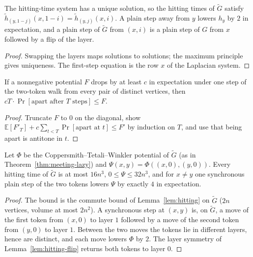 \begin{lemma}\label{lem:hitting-flip}
\leanok{}
The hitting-time system has a unique solution, so the hitting times of $\tilde G$ satisfy
$\tilde h_{(y,1-j)}(x,1-i)=\tilde h_{(y,j)}(x,i)$. A plain step away from $y$ lowers $h_y$ by $2$
in expectation, and a plain step of $\tilde G$ from $(x,i)$ is a plain step of $G$ from $x$
followed by a flip of the layer.
\end{lemma}
\begin{proof}\leanok
Swapping the layers maps solutions to solutions; the maximum principle gives uniqueness. The
first-step equation is the row $x$ of the Laplacian system.
\end{proof}
\begin{lemma}\label{lem:additive-drift}
\leanok{}
If a nonnegative potential $F$ drops by at least $c$ in expectation under one step of the
two-token walk from every pair of distinct vertices, then
$cT\cdot\Pr[\text{apart after }T\text{ steps}]\le F$.
\end{lemma}
\begin{proof}\leanok
Truncate $F$ to $0$ on the diagonal, show
$\mathbb E[F'_T]+c\sum_{t<T}\Pr[\text{apart at }t]\le F'$ by induction on $T$, and use that
being apart is antitone in $t$.
\end{proof}
\begin{lemma}\label{lem:plain-drift}
\leanok{}
Let $\Phi$ be the Coppersmith--Tetali--Winkler potential of $\tilde G$ (as in
Theorem~\ref{thm:meeting-lazy}) and $\Psi(x,y)=\Phi((x,0),(y,0))$. Every hitting time of
$\tilde G$ is at most $16n^3$, $0\le\Psi\le 32n^3$, and for $x\neq y$ one synchronous plain step
of the two tokens lowers $\Psi$ by exactly $4$ in expectation.
\end{lemma}
\begin{proof}\leanok
The bound is the commute bound of Lemma~\ref{lem:hitting} on $\tilde G$ ($2n$ vertices, volume
at most $2n^2$). A synchronous step at $(x,y)$ is, on $\tilde G$, a move of the first token from
$(x,0)$ to layer $1$ followed by a move of the second token from $(y,0)$ to layer $1$. Between
the two moves the tokens lie in different layers, hence are distinct, and each move lowers
$\Phi$ by $2$. The layer symmetry of Lemma~\ref{lem:hitting-flip} returns both tokens to
layer $0$.
\end{proof}
